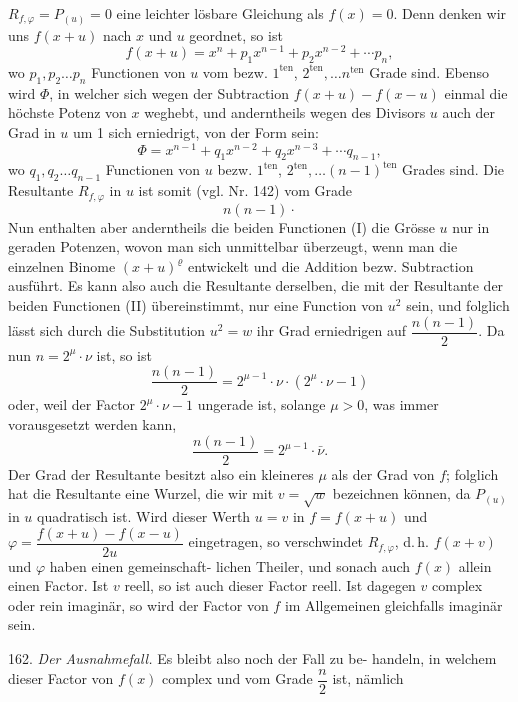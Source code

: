 $R_{f,\varphi} = P_{(u)} = 0$ eine leichter lösbare Gleichung als $f(x) = 0$. Denn
denken wir uns $f(x+u)$ nach $x$ und $u$ geordnet, so ist
\[ f(x+u) = x^n + p_1x^{n-1} + p_2x^{n-2} + \cdots p_n, \]
wo $p_1, p_2 \ldots p_n$ Functionen von $u$ vom bezw. $1^{\text{ten}}$, $2^{\text{ten}}, \ldots n^{\text{ten}}$ Grade
sind. Ebenso wird $\Phi$, in welcher sich wegen der Subtraction
$f(x+u) - f(x-u)$ einmal die höchste Potenz von $x$ weghebt, und
anderntheils wegen des Divisors $u$ auch der Grad in $u$ um 1 sich
erniedrigt, von der Form sein:
\[ \Phi = x^{n-1} + q_1x^{n-2} + q_2x^{n-3} + \cdots q_{n-1}, \]
wo $q_1, q_2 \ldots q_{n-1}$ Functionen von $u$ bezw. $1^{\text{ten}}$, $2^{\text{ten}}, \ldots (n-1)^{\text{ten}}$ Grades
sind. Die Resultante $R_{f,\varphi}$ in $u$ ist somit (vgl. Nr. 142) vom Grade
\[ n(n-1)\cdot \]
Nun enthalten aber anderntheils die beiden Functionen (I) die Grösse $u$
nur in geraden Potenzen, wovon man sich unmittelbar überzeugt, wenn
man die einzelnen Binome $(x+u)^\varrho$ entwickelt und die Addition bezw.
Subtraction ausführt. Es kann also auch die Resultante derselben,
die mit der Resultante der beiden Functionen (II) übereinstimmt, nur
eine Function von $u^2$ sein, und folglich lässt sich durch die Substitution
$u^2 = w$ ihr Grad erniedrigen auf $\dfrac{n(n-1)}{2}$. Da nun $n = 2^\mu \cdot \nu$ ist,
so ist
\[ \frac{n(n-1)}{2} = 2^{\mu-1} \cdot \nu \cdot (2^\mu \cdot \nu - 1) \]
oder, weil der Factor $2^\mu \cdot \nu - 1$ ungerade ist, solange $\mu > 0$, was immer
vorausgesetzt werden kann,
\[ \frac{n(n-1)}{2} = 2^{\mu-1} \cdot \bar{\nu}. \]
Der Grad der Resultante besitzt also ein kleineres $\mu$ als der Grad
von $f$; folglich hat die Resultante eine Wurzel, die wir mit $v = \sqrt{w}$
bezeichnen können, da $P_{(u)}$ in $u$ quadratisch ist. Wird dieser Werth
$u = v$ in $f = f(x+u)$ und $\varphi = \dfrac{f(x+u) - f(x-u)}{2u}$ eingetragen, so
verschwindet $R_{f,\varphi}$, d.\,h. $f(x+v)$ und $\varphi$ haben einen gemeinschaft-
lichen Theiler, und sonach auch $f(x)$ allein einen Factor. Ist $v$ reell, so
ist auch dieser Factor reell. Ist dagegen $v$ complex oder rein imaginär,
so wird der Factor von $f$ im Allgemeinen gleichfalls imaginär sein.

162. \textit{Der Ausnahmefall.} Es bleibt also noch der Fall zu be-
handeln, in welchem dieser Factor von $f(x)$ complex und vom Grade $\dfrac{n}{2}$
ist, nämlich



